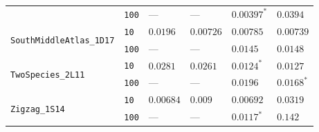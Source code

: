 \begin{footnotesize}
\begin{tabular}{llllll}
 & \texttt{100} & --- & --- & $\mathbf{0.00397}^*$ & $0.0394$ \\
\cline{1-6}
\multirow[c]{2}{*}{\texttt{SouthMiddleAtlas\_1D17}} & \texttt{10} & $0.0196$ & $\mathbf{0.00726}$ & $0.00785$ & $0.00739$ \\
 & \texttt{100} & --- & --- & $\mathbf{0.0145}$ & $0.0148$ \\
\cline{1-6}
\multirow[c]{2}{*}{\texttt{TwoSpecies\_2L11}} & \texttt{10} & $0.0281$ & $0.0261$ & $\mathbf{0.0124}^*$ & $0.0127$ \\
 & \texttt{100} & --- & --- & $0.0196$ & $\mathbf{0.0168}^*$ \\
\cline{1-6}
\multirow[c]{2}{*}{\texttt{Zigzag\_1S14}} & \texttt{10} & $\mathbf{0.00684}$ & $0.009$ & $0.00692$ & $0.0319$ \\
 & \texttt{100} & --- & --- & $\mathbf{0.0117}^*$ & $0.142$ \\
\cline{1-6}
\bottomrule
\end{tabular}
\end{footnotesize}
